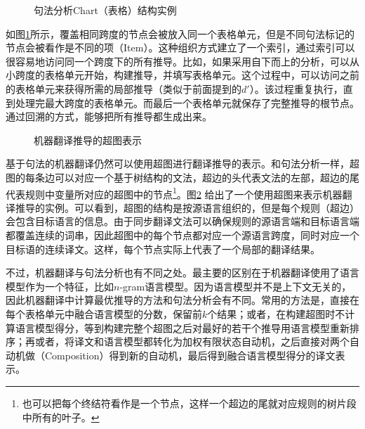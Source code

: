 \begin{figure}[htp]
\centering

\caption{句法分析Chart（表格）结构实例}
\label{fig:8-38}
\end{figure}

\parinterval 如图\ref{fig:8-38}所示，覆盖相同跨度的节点会被放入同一个表格单元，但是不同句法标记的节点会被看作是不同的项（Item）。这种组织方式建立了一个索引，通过索引可以很容易地访问同一个跨度下的所有推导。比如，如果采用自下而上的分析，可以从小跨度的表格单元开始，构建推导，并填写表格单元。这个过程中，可以访问之前的表格单元来获得所需的局部推导（类似于前面提到的$d'$）。该过程重复执行，直到处理完最大跨度的表格单元。而最后一个表格单元就保存了完整推导的根节点。通过回溯的方式，能够把所有推导都生成出来。

\begin{figure}[htp]
\centering

\setlength{\abovecaptionskip}{-0.5em}
\caption{机器翻译推导的超图表示}
\label{fig:8-39}
\end{figure}

\parinterval 基于句法的机器翻译仍然可以使用超图进行翻译推导的表示。和句法分析一样，超图的每条边可以对应一个基于树结构的文法，超边的头代表文法的左部，超边的尾代表规则中变量所对应的超图中的节点\footnote[10]{ 也可以把每个终结符看作是一个节点，这样一个超边的尾就对应规则的树片段中所有的叶子。}。图\ref{fig:8-39} 给出了一个使用超图来表示机器翻译推导的实例。可以看到，超图的结构是按源语言组织的，但是每个规则（超边）会包含目标语言的信息。由于同步翻译文法可以确保规则的源语言端和目标语言端都覆盖连续的词串，因此超图中的每个节点都对应一个源语言跨度，同时对应一个目标语的连续译文。这样，每个节点实际上代表了一个局部的翻译结果。

\parinterval 不过，机器翻译与句法分析也有不同之处。最主要的区别在于机器翻译使用了语言模型作为一个特征，比如$n$-gram语言模型。因为语言模型并不是上下文无关的，因此机器翻译中计算最优推导的方法和句法分析会有不同。常用的方法是，直接在每个表格单元中融合语言模型的分数，保留前$k$个结果；或者，在构建超图时不计算语言模型得分，等到构建完整个超图之后对最好的若干个推导用语言模型重新排序；再或者，将译文和语言模型都转化为加权有限状态自动机，之后直接对两个自动机做{\small{}}（Composition）得到新的自动机，最后得到融合语言模型得分的译文表示。

